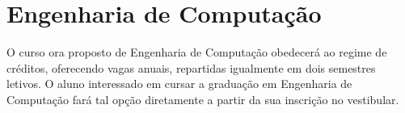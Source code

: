 
\chapter{Engenharia de Computação}
O curso ora proposto de Engenharia de Computação obedecerá ao regime de créditos, oferecendo \vagas vagas anuais, repartidas igualmente em dois semestres letivos. O aluno interessado em cursar a graduação em Engenharia de Computação fará tal opção diretamente a partir da sua inscrição no vestibular.

























